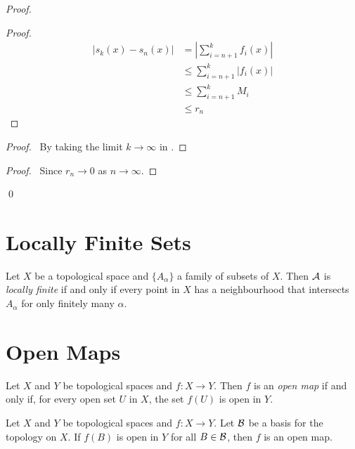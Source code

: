 \begin{proof}
    \pf
    \begin{proof}
        \pf
        \begin{align*}
            |s_k(x) - s_n(x)| & = |\sum_{i=n+1}^k f_i(x)| \\
            & \leq \sum_{i=n+1}^k |f_i(x)| \\
            & \leq \sum_{i=n+1}^k M_i \\
            & \leq r_n
        \end{align*}
    \end{proof}
    \begin{proof}
        \pf\ By taking the limit $k \rightarrow \infty$ in .
    \end{proof}
    \qedstep
    \begin{proof}
        \pf\ Since $r_n \rightarrow 0$ as $n \rightarrow \infty$.
    \end{proof}
    \qed
\end{proof}

\section{Locally Finite Sets}

\begin{definition}
    Let $X$ be a topological space and $\{ A_\alpha \}$ a family of subsets of $X$. Then $\AA$ is \emph{locally finite} if and only if every point in $X$ has a neighbourhood that
    intersects $A_\alpha$ for only finitely many $\alpha$.
\end{definition}

\section{Open Maps}

\begin{definition}
    Let $X$ and $Y$ be topological spaces and $f : X \rightarrow Y$. Then $f$ is an \emph{open map} if and
    only if, for every open set $U$ in $X$, the set $f(U)$ is open in $Y$.
\end{definition}

\begin{lemma}
    \label{lemma:open_map_basis}
    Let $X$ and $Y$ be topological spaces and $f : X \rightarrow Y$. Let $\BB$ be a basis for the topology on $X$.
    If $f(B)$ is open in $Y$ for all $B \in \BB$, then $f$ is an open map.
\end{lemma}

